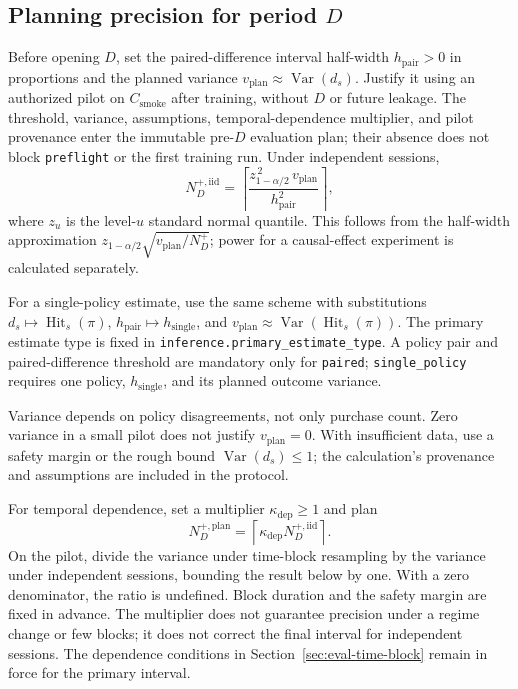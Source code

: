 \documentclass[12pt,a4paper]{article}
\newcommand{\code}[1]{{\ttfamily\small\nolinkurl{#1}}}
\DeclareMathOperator{\Var}{Var}
\theoremstyle{plainru}
\begin{document}
\subsection{Planning precision for period \texorpdfstring{$D$}{D}}
\label{sec:eval-precision}

Before opening $D$, set the paired-difference interval half-width
$h_{\mathrm{pair}}>0$ in proportions and the planned variance
$v_{\mathrm{plan}}\approx\Var(d_s)$. Justify it using an authorized
pilot on $C_{\mathrm{smoke}}$ after training, without $D$ or future leakage.
The threshold, variance, assumptions, temporal-dependence multiplier, and pilot provenance
enter the immutable pre-$D$ evaluation plan; their absence does not block
\code{preflight} or the first training run. Under independent sessions,
\begin{equation}\label{eq:eval-precision-size}
 N_D^{+,\mathrm{iid}}=
 \left\lceil
 \frac{z_{1-\alpha/2}^{\,2}\,v_{\mathrm{plan}}}
      {h_{\mathrm{pair}}^2}
 \right\rceil,
\end{equation}
where $z_u$ is the level-$u$ standard normal quantile.
This follows from the half-width approximation
$z_{1-\alpha/2}\sqrt{v_{\mathrm{plan}}/N_D^+}$; power for a causal-effect
experiment is calculated separately.

For a single-policy estimate, use the same scheme with substitutions
$d_s\mapsto\operatorname{Hit}_s(\pi)$,
$h_{\mathrm{pair}}\mapsto h_{\mathrm{single}}$, and
$v_{\mathrm{plan}}\approx\Var(\operatorname{Hit}_s(\pi))$.
The primary estimate type is fixed in \code{inference.primary_estimate_type}.
A policy pair and paired-difference threshold are mandatory only for
\code{paired}; \code{single_policy} requires one policy,
$h_{\mathrm{single}}$, and its planned outcome variance.

Variance depends on policy disagreements, not only purchase count.
Zero variance in a small pilot does not justify $v_{\mathrm{plan}}=0$.
With insufficient data, use a safety margin or the rough bound $\Var(d_s)\le1$;
the calculation's provenance and assumptions are included in the protocol.

For temporal dependence, set a multiplier
$\kappa_{\mathrm{dep}}\ge1$ and plan
\begin{equation}\label{eq:eval-precision-dependent}
 N_D^{+,\mathrm{plan}}=
 \left\lceil\kappa_{\mathrm{dep}}N_D^{+,\mathrm{iid}}\right\rceil.
\end{equation}
On the pilot, divide the variance under time-block resampling
by the variance under independent sessions, bounding the result below by one.
With a zero denominator, the ratio is undefined. Block duration
and the safety margin are fixed in advance. The multiplier does not guarantee precision under a regime
change or few blocks; it does not correct the final interval
for independent sessions.
The dependence conditions in Section~\ref{sec:eval-time-block}
remain in force for the primary interval.
\end{document}
